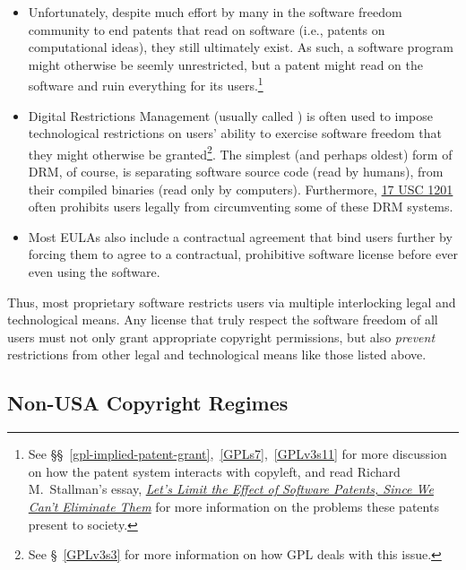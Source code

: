 \begin{itemize}

\item Unfortunately, despite much effort by many in the software freedom
  community to end patents that read on software (i.e., patents on
  computational ideas), they still ultimately exist.  As such, a software
  program might otherwise be seemly unrestricted, but a patent might read on
  the software and ruin everything for its users.\footnote{See
  \S\S~\ref{gpl-implied-patent-grant},~\ref{GPLs7},~\ref{GPLv3s11} for more
  discussion on how the patent system interacts with copyleft, and read
  Richard M.~Stallman's essay,
  \href{http://www.wired.com/opinion/2012/11/richard-stallman-software-patents/}{\textit{Let’s
      Limit the Effect of Software Patents, Since We Can’t Eliminate Them}}
  for more information on the problems these patents present to society.}

\item Digital Restrictions Management (usually called ) is often
  used to impose technological restrictions on users' ability to exercise
  software freedom that they might otherwise be granted\footnote{See
    \S~\ref{GPLv3s3} for more information on how GPL deals with this issue.}.
  The simplest (and perhaps oldest) form of DRM, of course, is separating
  software source code (read by humans), from their compiled binaries (read
  only by computers).  Furthermore,
  \href{http://www.law.cornell.edu/uscode/text/17/1201}{17 USC 1201} often
  prohibits users legally from circumventing some of these DRM systems.

\item Most EULAs also include a contractual agreement that bind users further
  by forcing them to agree to a contractual, prohibitive software license
  before ever even using the software.

\end{itemize}

Thus, most proprietary software restricts users via multiple interlocking
legal and technological means.  Any license that truly respect the software
freedom of all users must not only grant appropriate copyright permissions,
but also \textit{prevent} restrictions from other legal and technological
means like those listed above.

\subsection{Non-USA Copyright Regimes}
\label{non-usa-copyright}

